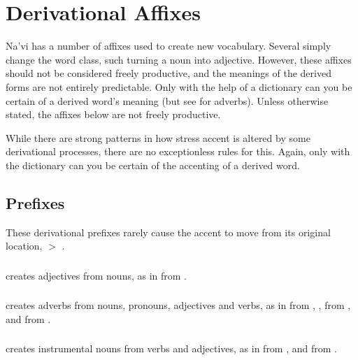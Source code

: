 
\section{Derivational Affixes}
\noindent Na'vi has a number of affixes used to create new vocabulary.
Several simply change the word class, such turning a noun into
adjective.  However, these affixes should not be considered freely
productive, and the meanings of the derived forms are not entirely
predictable.\label{lingop:affixes} Only with the help of a dictionary
can you be certain of a derived word's meaning (but see
 for adverbs).  Unless otherwise stated, the
affixes below are not freely productive.

\medskip
\noindent While there are strong patterns in how stress accent is
altered by some derivational processes, there are no exceptionless
rules for this.  Again, only with the dictionary can you be certain of
the accenting of a derived word.


\subsection{Prefixes} These derivational prefixes rarely cause the
accent to move from its original location,  $>$ .

\subsubsection{}  creates adjectives from nouns, as in
  from  .

\subsubsection{}  creates adverbs from nouns, pronouns,
adjectives and verbs, as in   from
,  ,   from
 , and   from 
.  

\subsubsection{}  creates instrumental nouns from verbs and
adjectives, as in   from
, and   from 
. 

